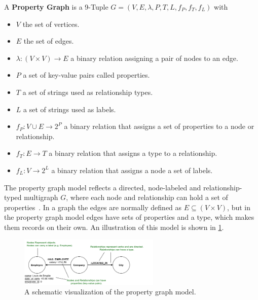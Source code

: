        A \textbf{Property Graph} is a 9-Tuple $G = (V, E, \lambda, P, T, L, f_P, f_T, f_L)$ with 
        \begin{itemize}
            \item $V$ the set of vertices.
            \item $E$ the set of edges.
            \item $\lambda: (V \times V) \rightarrow E$ a binary relation assigning a pair of nodes to an edge.
            \item $P$ a set of key-value pairs called properties.
            \item $T$ a set of strings used as relationship types.
            \item $L$ a set of strings used as labels.
            \item $f_P: V \cup E \rightarrow 2^P$ a binary relation that assigns a set of properties to a node or relationship.
            \item $f_T: E \rightarrow T$ a binary relation that assigns a type to a relationship.
            \item  $f_L: V \rightarrow 2^L$ a binary relation that assigns a node a set of labels.
        \end{itemize} 
        \smallskip
        The property graph model reflects a directed, node-labeled and relationship-typed multigraph $G$, where each node and relationship can hold a set of properties~\cite{angles2018property, rodriguez2012graph, Rodriguez2010ConstructionsFD}.
        In a graph the edges are normally defined as $E \subseteq (V \times V)$, but in the property graph model edges have sets of properties and a type, which makes them records on their own. 
        An illustration of this model is shown in \ref{propertygraph}.
        
        \begin{figure}
            \begin{center}
                \includegraphics[keepaspectratio,width=0.6\textwidth]{img/03-preliminaries/property_graph_elements.png}
            \end{center}
            \caption{A schematic visualization of the property graph model.} 
            \label{propertygraph}
        \end{figure}

